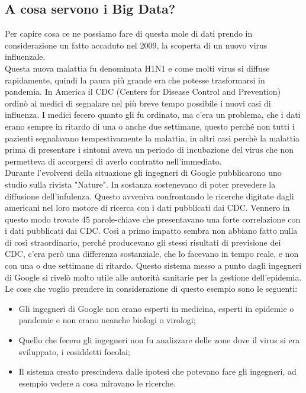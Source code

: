 \subsection{A cosa servono i Big Data?}\label{aCosaServono}

Per capire cosa ce ne possiamo fare di questa mole di dati prendo in considerazione un fatto accaduto nel 2009, la scoperta di un nuovo virus influenzale.\\
Questa nuova malattia fu denominata H1N1 e come molti virus si diffuse rapidamente, quindi la paura pi\`u grande era che potesse trasformarsi in pandemia. In America il CDC (Centers for Disease Control and Prevention) ordin\`o ai medici di segnalare nel pi\`u breve tempo possibile i nuovi casi di influenza. I medici fecero quanto gli fu ordinato, ma c'era un problema, che i dati erano sempre in ritardo di una o anche due settimane, questo perch\'e non tutti i pazienti segnalavano tempestivamente la malattia, in altri casi perch\`e la malattia prima di presentare i sintomi aveva un periodo di incubazione del virus che non permetteva di accorgersi di averlo contratto nell'immediato.\\
Durante l'evolversi della situazione gli ingegneri di Google pubblicarono uno studio sulla rivista "Nature". In sostanza sostenevano di poter prevedere la diffusione dell'infulenza. Questo avveniva confrontando le ricerche digitate dagli americani nel loro motore di ricerca con i dati pubblicati dai CDC. Vennero in questo modo trovate 45 parole-chiave che presentavano una forte correlazione con i dati pubblicati dai CDC. Cos\`i a primo impatto sembra non abbiano fatto nulla di cos\`i straordinario, perch\'e producevano gli stessi risultati di previsione dei CDC, c'era per\`o una differenza sostanziale, che lo facevano in tempo reale, e non con una o due settimane di ritardo. Questo sistema messo a punto dagli ingegneri di Google si rivel\`o molto utile alle autorit\`a sanitarie per la gestione dell'epidemia.\\
Le cose che voglio prendere in considerazione di questo esempio sono le seguenti:
\begin{itemize}
    \item Gli ingegneri di Google non erano esperti in medicina, esperti in epidemie o pandemie e non erano neanche biologi o virologi;
    \item Quello che fecero gli ingegneri non fu analizzare delle zone dove il virus si era sviluppato, i cosiddetti focolai;
    \item Il sistema creato prescindeva dalle ipotesi che potevano fare gli ingegneri, ad esempio vedere a cosa miravano le ricerche.
\end{itemize}

